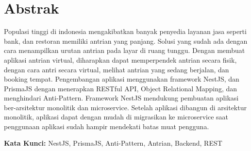 \chapter*{Abstrak}
Populasi tinggi di indonesia mengakibatkan banyak penyedia layanan jasa seperti bank, dan restoran memiliki antrian yang panjang. Solusi yang sudah ada dengan cara menampilkan urutan antrian  pada layar di ruang tunggu. Dengan membuat aplikasi antrian virtual, diharapkan dapat memperpendek antrian secara fisik, dengan cara antri secara virtual, melihat antrian yang sedang berjalan, dan booking tempat. Pengembangan aplikasi menggunakan framework NestJS, dan PrismaJS dengan menerapkan RESTful API, Object Relational Mapping, dan menghindari Anti-Pattern. Framework NestJS mendukung pembuatan aplikasi ber-arsitektur monolitik dan microservice. Setelah aplikasi dibangun di arsitektur monolitik, aplikasi dapat dengan mudah di migrasikan ke microservice saat penggunaan aplikasi sudah hampir mendekati batas muat pengguna.

\vspace{0.5 cm}
\begin{flushleft}
{\textbf{Kata Kunci:} NestJS, PrismaJS, Anti-Pattern, Antrian, Backend, REST}
\end{flushleft}